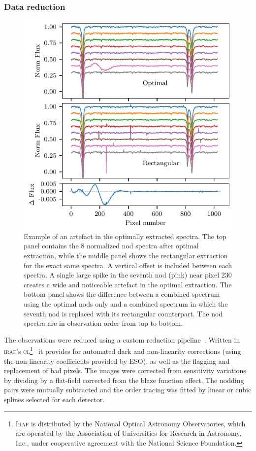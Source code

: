\documentclass[fleqn,usenatbib]{mnras}
\begin{document}
\subsubsection{Data reduction}
\label{subsubsec:reduction}
\begin{figure}
    \includegraphics[width=\hsize]{images/fig1.pdf}
    \caption{Example of an artefact in the optimally extracted spectra. The top panel contains the 8 normalized nod spectra after optimal extraction, while the middle panel shows the rectangular extraction for the exact same spectra. A vertical offset is included between each spectra. A single large spike in the seventh nod (pink) near pixel 230 creates a wide and noticeable artefact in the optimal extraction. The bottom panel shows the difference between a combined spectrum using the optimal nods only and a combined spectrum in which the seventh nod is replaced with its rectangular counterpart. The nod spectra are in observation order from top to bottom.}
    \label{fig:nod_artefacts}
\end{figure}

The observations were reduced using a custom reduction pipeline~\citep{figueira_radial_2010}. Written in \textsc{iraf}'s \textsc{cl}\footnote{\textsc{Iraf} is distributed by the National Optical Astronomy Observatories, which are operated by the Association of Universities for Research in Astronomy, {Inc.}, under cooperative agreement with the National Science Foundation.}~\citep{tody_iraf_1993} it provides for automated dark and non-linearity corrections (using the non-linearity coefficients provided by ESO), as well as the flagging and replacement of bad pixels. The images were corrected from sensitivity variations by dividing by a flat-field corrected from the blaze function effect. The nodding pairs were mutually subtracted and the order tracing was fitted by {linear or cubic splines selected for each detector}.
\end{document}
